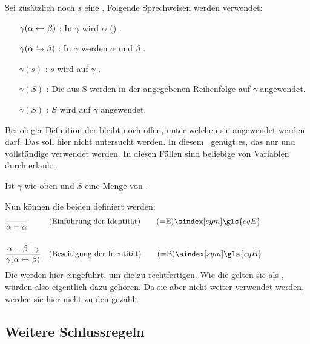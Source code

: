 {Sei zusätzlich noch $s$ eine .
Folgende Sprechweisen werden verwendet:
\begin{itemize}
	\renewcommand*{\itemindent}{1,5cm}
	\renewcommand*{\labelsep}{5pt}
	\item [$\gamma(\alpha \leftarrowtail \beta)$ :] In $\gamma$ wird $\alpha$ () .
	\item [$\gamma(\alpha \leftrightarrows \beta)$ :] In $\gamma$ werden $\alpha$ und $\beta$ .
	\item [$\gamma(s)$ :] $s$ wird auf $\gamma$ .
	\item [$\gamma(S)$ :] Die  aus S werden in der angegebenen Reihenfolge auf $\gamma$ angewendet.
	\item [$\gamma(S)$ :] $S$ wird auf $\gamma$ angewendet.
\end{itemize}
%
Bei obiger Definition der  bleibt noch offen, unter welchen  sie angewendet werden darf. Das soll hier nicht untersucht werden. In diesem \sectionname\ genügt es, das nur  und vollständige  verwendet werden.
In diesen Fällen sind beliebige  von Variablen durch  erlaubt.

Ist $\gamma$ wie oben und $S$ eine Menge von .

Nun können die beiden  definiert werden:
\begin{align}
	& \frac{}{\alpha\eq\alpha}
	& & (\text{Einführung der Identität})
	\tag{\tageqE} \sym{\gls{eqE}} \label{def:eqE}
	\\\\
	& \frac{\alpha\eq\beta \srand \gamma}{\gamma(\alpha\subst\beta)}
	& & (\text{Beseitigung der Identität})
	\tag{\tageqB} \sym{\gls{eqB}} \label{def:eqB}
	\formulatoleft
\end{align}
%
Die  werden hier eingeführt, um die  zu rechtfertigen.
Wie die  gelten sie als \Axiome, würden also eigentlich dazu gehören.
Da sie aber nicht weiter verwendet werden, werden sie hier nicht zu den  gezählt.

\subsection{Weitere Schlussregeln}%
\label{sub:weitereSchlussregeln}

}

